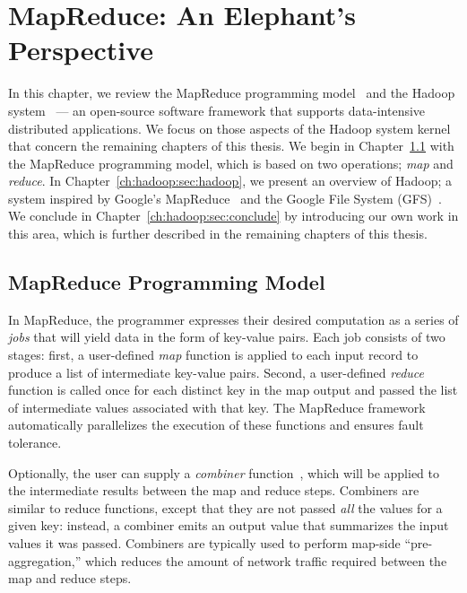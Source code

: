 \chapter[MapReduce: An Elephant's Perspective]{MapReduce: An Elephant's Perspective}
\label{ch:hadoop}

In this chapter, we review the MapReduce programming
model~\cite{mapreduce-osdi} and the Hadoop system~\cite{hadoop} --- an
open-source software framework that supports data-intensive distributed
applications.  We focus on those aspects of the Hadoop system kernel that
concern the remaining chapters of this thesis.  We begin in
Chapter~\ref{ch:hadoop:sec:progmodel} with the MapReduce programming model,
which is based on two operations; {\em map} and {\em reduce}.  In
Chapter~\ref{ch:hadoop:sec:hadoop}, we present an overview of Hadoop; a system
inspired by Google's MapReduce~\cite{mapreduce-osdi} and the Google File System
(GFS)~\cite{gfs-sosp}.  We conclude in Chapter~\ref{ch:hadoop:sec:conclude} by
introducing our own work in this area, which is further described in the
remaining chapters of this thesis.

\section{MapReduce Programming Model}
\label{ch:hadoop:sec:progmodel}

In MapReduce, the programmer expresses their desired computation as a series of
\emph{jobs} that will yield data in the form of key-value pairs.  Each job
consists of two stages: first, a user-defined \emph{map} function is applied to
each input record to produce a list of intermediate key-value pairs.  Second, a
user-defined \emph{reduce} function is called once for each distinct key in the
map output and passed the list of intermediate values associated with that key.
The MapReduce framework automatically parallelizes the execution of these
functions and ensures fault tolerance.

Optionally, the user can supply a \emph{combiner}
function~\cite{mapreduce-osdi}, which will be applied to the intermediate results
between the map and reduce steps.  Combiners are similar to reduce functions,
except that they are not passed \emph{all} the values for a given key: instead,
a combiner emits an output value that summarizes the input values it was
passed.  Combiners are typically used to perform map-side ``pre-aggregation,''
which reduces the amount of network traffic required between the map and reduce
steps.

